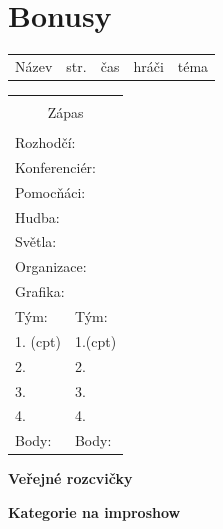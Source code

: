 \documentclass[a4paper,10pt,openany]{book}
\begin{document}
\chapter{Bonusy}
\pagebreak
\newcommand{\btbinfo}[6]{

\ifx Z#6 \textbf{#1} \else #1 \small{  (i)} \fi   & \pageref{#2} &  \small{#3} & \small{#4} & \small{#5}\hline
}
\begin{longtable}{|p{4cm}|p{.4cm}|p{3.2cm}|p{3cm}|p{4.2cm}|}
\hline
Název&str.&čas&hráči&téma \hline


\end{longtable}
\pagebreak
\renewcommand{\btbinfo}[6]{
\ifx Z#6 #1   \fi

}
\begin{multicols}{3}
 \begin{tabular}[t]{|p{25mm}|p{25mm}    |}
 \hline
 \multicolumn{2}{|c|}{ } \\
 \multicolumn{2}{|c|}{\large{Zápas}} \\
 \multicolumn{2}{|c|}{ } \\
\hline
\multicolumn{2}{|l|}{ Rozhodčí: }   \\ \hline
\multicolumn{2}{|l|}{ Konferenciér: }   \\ \hline
\multicolumn{2}{|l|}{ Pomocňáci: }   \\ \hline
\multicolumn{2}{|l|}{ Hudba: }   \\ \hline
\multicolumn{2}{|l|}{ Světla: }   \\ \hline
\multicolumn{2}{|l|}{ Organizace: }   \\ \hline
\multicolumn{2}{|l|}{ Grafika: }   \\ \hline
Tým: &  Tým:\\ \hline
1. \small{(cpt)}  & 1.\small{(cpt)} \\ \hline
2.  & 2. \\ \hline
3. & 3. \\ \hline
4.  & 4. \\ \hline
Body:  & Body: \\ \hline

\end{tabular}
\vspace{3mm}

\end {multicols}
\renewcommand{\btbinfo}[6]{
\ifx Z#6  \else
\large{#1 }

  \fi
}
\hline

\begin{multicols}{3}
\large{\textbf{Veřejné rozcvičky}}


\end {multicols}
\hline

\begin{multicols}{3}
\large{\textbf{Kategorie na improshow}}


\end {multicols}


\pagebreak
\newcommand{\faulinfo}[5]{
#4 & #1 & #3 & #5 \\

}

\begin{tabular}[t]{|p{3cm}|p{4cm}|p{1cm}|p{6cm}    |}

\end{tabular}
\pagebreak
\setcounter{tocdepth}{1}
\tableofcontents
\end{document}
